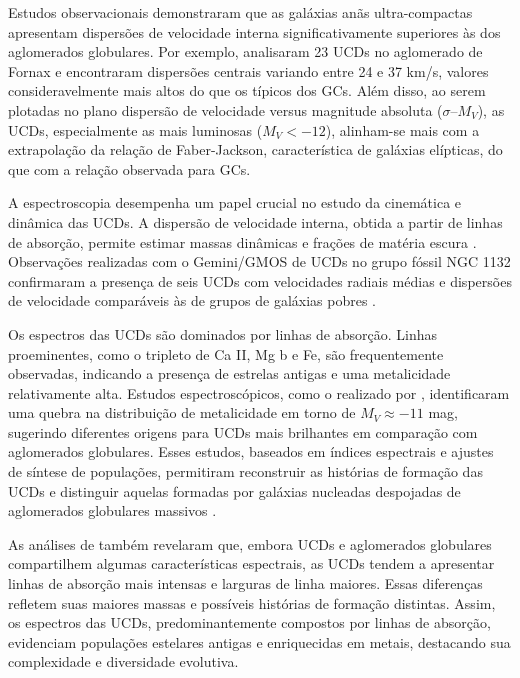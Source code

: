 Estudos observacionais demonstraram que as galáxias anãs ultra-compactas apresentam dispersões de velocidade interna significativamente superiores às dos aglomerados globulares. Por exemplo, \cite{Mieske_2008_1} analisaram 23 UCDs no aglomerado de Fornax e encontraram dispersões centrais variando entre 24 e 37 km/s, valores consideravelmente mais altos do que os típicos dos GCs. Além disso, ao serem plotadas no plano dispersão de velocidade versus magnitude absoluta ($\sigma$–$M_V$), as UCDs, especialmente as mais luminosas ($M_V < -12$), alinham-se mais com a extrapolação da relação de Faber-Jackson, característica de galáxias elípticas, do que com a relação observada para GCs.

A espectroscopia desempenha um papel crucial no estudo da cinemática e dinâmica das UCDs. A dispersão de velocidade interna, obtida a partir de linhas de absorção, permite estimar massas dinâmicas e frações de matéria escura \citep{Chilingarian_2011}. Observações realizadas com o Gemini/GMOS de UCDs no grupo fóssil NGC 1132 confirmaram a presença de seis UCDs com velocidades radiais médias e dispersões de velocidade comparáveis às de grupos de galáxias pobres \citep{Madrid_2013}.

Os espectros das UCDs são dominados por linhas de absorção. Linhas proeminentes, como o tripleto de Ca II, Mg b e Fe, são frequentemente observadas, indicando a presença de estrelas antigas e uma metalicidade relativamente alta. Estudos espectroscópicos, como o realizado por \cite{Mieske_2006}, identificaram uma quebra na distribuição de metalicidade em torno de $M_V \approx -11$ mag, sugerindo diferentes origens para UCDs mais brilhantes em comparação com aglomerados globulares. Esses estudos, baseados em índices espectrais e ajustes de síntese de populações, permitiram reconstruir as histórias de formação das UCDs e distinguir aquelas formadas por galáxias nucleadas despojadas de aglomerados globulares massivos \citep{Mieske_2006}.

As análises de \cite{Mieske_2006} também revelaram que, embora UCDs e aglomerados globulares compartilhem algumas características espectrais, as UCDs tendem a apresentar linhas de absorção mais intensas e larguras de linha maiores. Essas diferenças refletem suas maiores massas e possíveis histórias de formação distintas. Assim, os espectros das UCDs, predominantemente compostos por linhas de absorção, evidenciam populações estelares antigas e enriquecidas em metais, destacando sua complexidade e diversidade evolutiva.

